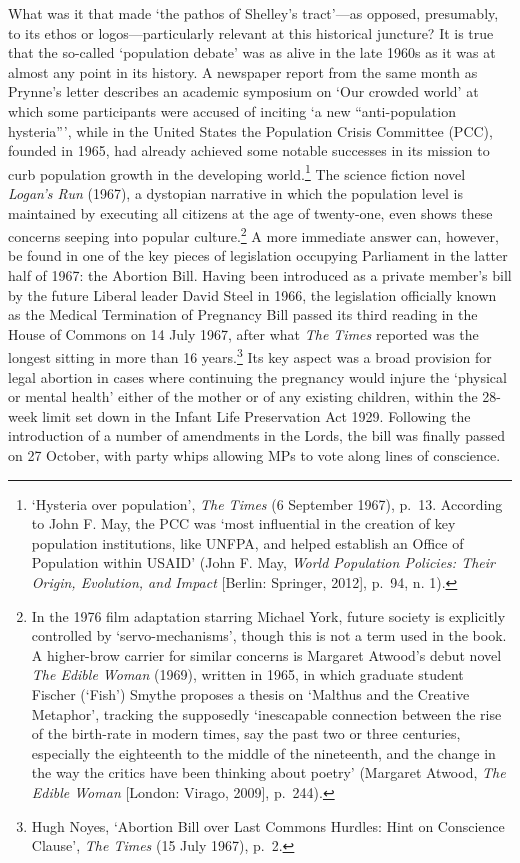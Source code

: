 \documentclass[]{article}
\begin{document}
\noindent What was it that made ‘the pathos of Shelley’s tract’—as
opposed, presumably, to its ethos or logos—particularly relevant at this
historical juncture? It is true that the so-called ‘population debate’
was as alive in the late 1960s as it was at almost any point in its
history. A newspaper report from the same month as Prynne’s letter
describes an academic symposium on ‘Our crowded world’ at which some
participants were accused of inciting ‘a new “anti-population
hysteria”’, while in the United States the Population Crisis Committee
(PCC), founded in 1965, had already achieved some notable successes in
its mission to curb population growth in the developing world.\footnote{‘Hysteria
  over population’, \emph{The Times} (6 September 1967), p.~13.
  According to John F. May, the PCC was ‘most influential in the
  creation of key population institutions, like UNFPA, and helped
  establish an Office of Population within USAID’ (John F. May,
  \emph{World Population Policies: Their Origin, Evolution, and Impact}
  {[}Berlin: Springer, 2012{]}, p.~94, n. 1).} The science fiction novel
\emph{Logan’s Run} (1967), a dystopian narrative in which the population
level is maintained by executing all citizens at the age of twenty-one,
even shows these concerns seeping into popular culture.\footnote{In the
  1976 film adaptation starring Michael York, future society is
  explicitly controlled by ‘servo-mechanisms’, though this is not a term
  used in the book. A higher-brow carrier for similar concerns is
  Margaret Atwood’s debut novel \emph{The Edible Woman} (1969), written
  in 1965, in which graduate student Fischer (‘Fish’) Smythe proposes a
  thesis on ‘Malthus and the Creative Metaphor’, tracking the supposedly
  ‘inescapable connection between the rise of the birth-rate in modern
  times, say the past two or three centuries, especially the eighteenth
  to the middle of the nineteenth, and the change in the way the critics
  have been thinking about poetry’ (Margaret Atwood, \emph{The Edible
  Woman} {[}London: Virago, 2009{]}, p.~244).} A more immediate answer
can, however, be found in one of the key pieces of legislation occupying
Parliament in the latter half of 1967: the Abortion Bill. Having been
introduced as a private member’s bill by the future Liberal leader David
Steel in 1966, the legislation officially known as the Medical
Termination of Pregnancy Bill passed its third reading in the House of
Commons on 14 July 1967, after what \emph{The Times} reported was the
longest sitting in more than 16 years.\footnote{Hugh Noyes, ‘Abortion
  Bill over Last Commons Hurdles: Hint on Conscience Clause’, \emph{The
  Times} (15 July 1967), p.~2.} Its key aspect was a broad provision for
legal abortion in cases where continuing the pregnancy would injure the
‘physical or mental health’ either of the mother or of any existing
children, within the 28-week limit set down in the Infant Life
Preservation Act 1929. Following the introduction of a number of
amendments in the Lords, the bill was finally passed on 27 October, with
party whips allowing MPs to vote along lines of conscience.
\end{document}
